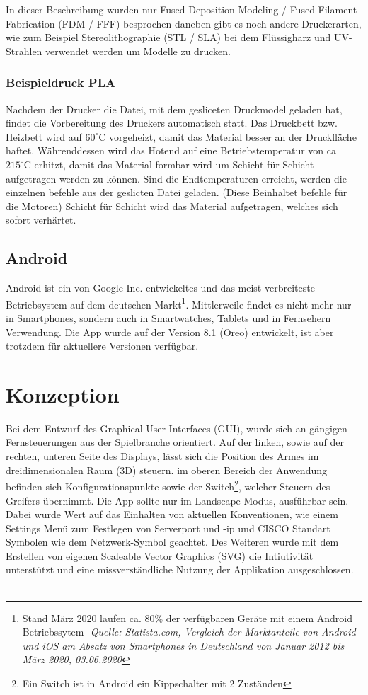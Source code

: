 \documentclass[12pt,					%
							 oneside,			%
							 a4paper,			%
							 halfparskip,		%
							 liststotoc,			%
							 bibtotoc,			%
							 fleqn,				%
							 pointlessnumbers]	%
							 {scrreprt}
\begin{document}
In dieser Beschreibung wurden nur Fused Deposition Modeling / Fused Filament Fabrication (FDM / FFF) besprochen daneben gibt es noch andere Druckerarten, wie zum Beispiel Stereolithographie (STL / SLA) bei dem Flüssigharz und UV-Strahlen verwendet werden um Modelle zu drucken.
\subsection{Beispieldruck PLA}
Nachdem der Drucker die Datei, mit dem gesliceten Druckmodel geladen hat, findet die Vorbereitung des Druckers automatisch statt.
Das Druckbett bzw. Heizbett wird auf $60^\circ\text{C}$ vorgeheizt, damit das Material besser an der Druckfläche haftet.
Währenddessen wird das Hotend auf eine Betriebstemperatur von ca  $215^\circ\text{C}$ erhitzt, damit das Material formbar wird um Schicht für Schicht aufgetragen werden zu können.
Sind die Endtemperaturen erreicht, werden die einzelnen befehle aus der geslicten Datei geladen. (Diese Beinhaltet befehle für die Motoren)
Schicht für Schicht wird das Material aufgetragen, welches sich sofort verhärtet.
\newpage
\section{Android}
Android ist ein von Google Inc. entwickeltes und das meist verbreiteste Betriebsystem auf dem deutschen Markt\footnote{Stand März 2020 laufen ca. 80\% der verfügbaren Geräte mit einem Android Betriebssytem -\textit{Quelle: Statista.com, \glqq{}Vergleich der Marktanteile von Android und iOS am Absatz von Smartphones in Deutschland von Januar 2012 bis März 2020\grqq{}, 03.06.2020}\cite{Tenzer2020}}. Mittlerweile findet es nicht mehr nur in Smartphones, sondern auch in Smartwatches, Tablets und in Fernsehern Verwendung. Die App wurde auf der Version 8.1 (Oreo) entwickelt, ist aber trotzdem für aktuellere Versionen verfügbar.
\chapter{Konzeption}
Bei dem Entwurf des Graphical User Interfaces (GUI), wurde sich an gängigen Fernsteuerungen aus der Spielbranche orientiert. Auf der linken, sowie auf der rechten, unteren Seite des Displays, lässt sich die Position des Armes im dreidimensionalen Raum (3D) steuern. im oberen Bereich der Anwendung befinden sich Konfigurationspunkte sowie der \glqq{}Switch\grqq{}\footnote{Ein Switch ist in Android ein Kippschalter mit 2 Zuständen}, welcher Steuern des Greifers übernimmt. Die App sollte nur im \glqq{}Landscape\grqq{}-Modus, ausführbar sein. Dabei wurde Wert auf das Einhalten von aktuellen Konventionen, wie einem Settings Menü zum Festlegen von Serverport und -ip und CISCO Standart Symbolen wie dem Netzwerk-Symbol geachtet. Des Weiteren wurde mit dem Erstellen von eigenen Scaleable Vector Graphics (SVG) die Intiutivität unterstützt und eine missverständliche Nutzung der Applikation ausgeschlossen.\\ \\
\end{document}

